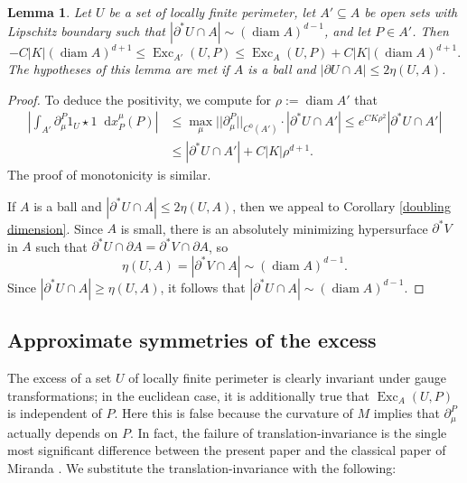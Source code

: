 \documentclass[reqno,10pt]{amsart}
\DeclareMathOperator{\diam}{diam}
\DeclareMathOperator{\Exc}{Exc}
\newcommand*\dif{\mathop{}\!\mathrm{d}}
\newtheorem{lemma}[theorem]{Lemma}
\theoremstyle{definition}
\numberwithin{equation}{section}
\begin{document}
\begin{lemma}
Let $U$ be a set of locally finite perimeter, let $A' \subseteq A$ be open sets with Lipschitz boundary such that $|\partial^* U \cap A| \sim (\diam A)^{d - 1}$,
and let $P \in A'$. Then
\begin{equation}\label{approximate monotone}
-C |K| (\diam A)^{d + 1} \leq \Exc_{A'}(U, P) \leq \Exc_A(U, P) + C |K|(\diam A)^{d + 1}.
\end{equation}
The hypotheses of this lemma are met if $A$ is a ball and $|\partial U \cap A| \leq 2\eta(U, A)$.
\end{lemma}
\begin{proof}
To deduce the positivity, we compute for $\rho := \diam A'$ that
\begin{align*}
    \left|\int_{A'} \partial^P_\mu 1_U \star 1 \dif x_P^\mu(P)\right|
 & \leq \max_\mu ||\partial^P_\mu||_{C^0(A')} \cdot |\partial^* U \cap A'| \leq e^{CK\rho^2} |\partial^* U \cap A'| \\
 & \leq |\partial^* U \cap A'| + C|K|\rho^{d + 1}.
\end{align*}
The proof of monotonicity is similar.

If $A$ is a ball and $|\partial^* U \cap A| \leq 2\eta(U, A)$, then we appeal to Corollary \ref{doubling dimension}.
Since $A$ is small, there is an absolutely minimizing hypersurface $\partial^* V$ in $A$ such that $\partial^* U \cap \partial A = \partial^* V \cap \partial A$, so
$$\eta(U, A) = |\partial^* V \cap A| \sim (\diam A)^{d - 1}.$$
Since $|\partial^* U \cap A| \geq \eta(U, A)$, it follows that $|\partial^* U \cap A| \sim (\diam A)^{d - 1}$.
\end{proof}


\subsection{Approximate symmetries of the excess} \label{translation appendix}
The excess of a set $U$ of locally finite perimeter is clearly invariant under gauge transformations; in the euclidean case, it is additionally true that $\Exc_A(U, P)$ is independent of $P$.
Here this is false because the curvature of $M$ implies that $\partial_\mu^P$ actually depends on $P$.
In fact, the failure of translation-invariance is the single most significant difference between the present paper and the classical paper of Miranda \cite{Miranda66}.
We substitute the translation-invariance with the following:
\end{document}
